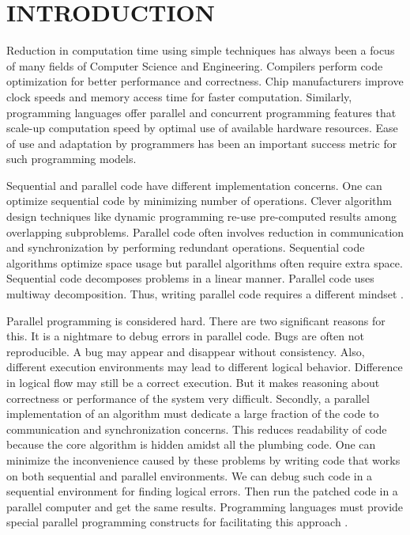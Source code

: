 \documentclass[12pt,a4paper]{article}
\begin{document}
	\section{\large INTRODUCTION}
    \indent \par Reduction in computation time using simple techniques has always been a focus of many fields of Computer Science and Engineering. Compilers perform code optimization for better performance and correctness. Chip manufacturers improve clock speeds and memory access time for faster computation. Similarly, programming languages offer parallel and concurrent programming features that scale-up computation speed by optimal use of available hardware resources. Ease of use and adaptation by programmers has been an important success metric for such programming models. \par
    Sequential and parallel code have different implementation concerns. One can optimize sequential code by minimizing number of operations. Clever algorithm design techniques like dynamic programming re-use pre-computed results among overlapping subproblems. Parallel code often involves reduction in communication and synchronization by performing redundant operations. Sequential code algorithms optimize space usage but parallel algorithms often require extra space. Sequential code decomposes problems in a linear manner. Parallel code uses multiway decomposition. Thus, writing parallel code requires a different mindset \cite{steele}. \par
	Parallel programming is considered hard. There are two significant reasons for this. It is a nightmare to debug errors in  parallel code. Bugs are often not reproducible. A bug may appear and disappear without consistency. Also, different execution environments may lead to different logical behavior. Difference in logical flow may still be a correct execution. But it makes reasoning about correctness or performance of the system very difficult. Secondly, a parallel implementation of an algorithm must dedicate a large fraction of the code to communication and synchronization concerns. This reduces readability of code because the core algorithm is hidden amidst all the plumbing code. One can minimize the inconvenience caused by these problems by writing code that works on both sequential and parallel environments. We can debug such code in a sequential environment for finding logical errors. Then run the patched code in a parallel computer and get the same results. Programming languages must provide special parallel programming constructs for facilitating this approach \cite{hammond}. \par
\end{document}
